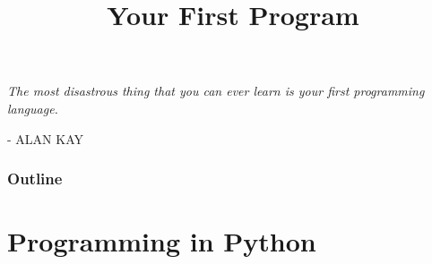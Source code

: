 \documentclass[8pt,a4paper,compress,handout]{beamer}
\title{Your First Program}
\date{}
\begin{document}
\begin{frame}
\hfill
\begin{minipage}{150pt}
\begin{flushright}
\tiny \emph{The most disastrous thing that you can ever learn is your first programming language.} 

\smallskip

- ALAN KAY
\end{flushright}
\end{minipage}
\vfill
\titlepage
\end{frame}

\begin{frame}
\frametitle{Outline}
\tableofcontents
\end{frame}

\section{Programming in Python}
\end{document}
